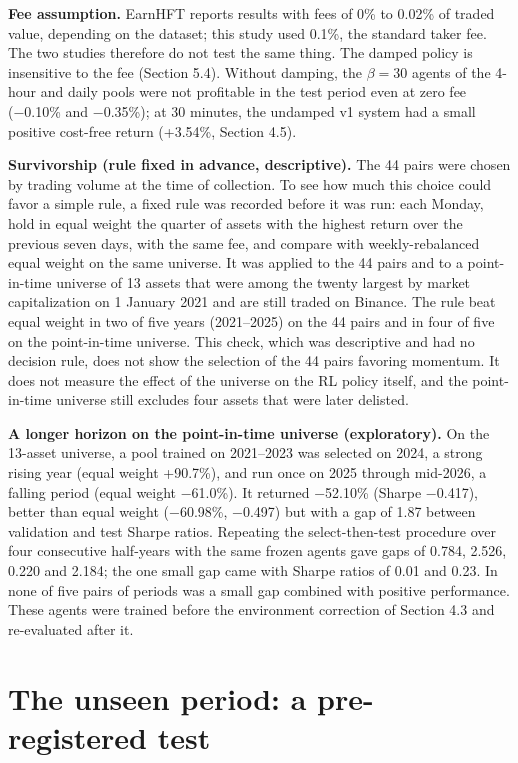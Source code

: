 \documentclass[12pt,a4paper]{report}
\newcounter{none} %
\begin{document}
\textbf{Fee assumption.} EarnHFT reports results with fees of 0\% to
0.02\% of traded value, depending on the dataset; this study used 0.1\%,
the standard taker fee. The two studies therefore do not test the same
thing. The damped policy is insensitive to the fee (Section 5.4).
Without damping, the \(\beta=30\) agents of the 4-hour and daily pools
were not profitable in the test period even at zero fee (−0.10\% and
−0.35\%); at 30 minutes, the undamped v1 system had a small positive
cost-free return (+3.54\%, Section 4.5).

\textbf{Survivorship (rule fixed in advance, descriptive).} The 44 pairs
were chosen by trading volume at the time of collection. To see how much
this choice could favor a simple rule, a fixed rule was recorded before
it was run: each Monday, hold in equal weight the quarter of assets with
the highest return over the previous seven days, with the same fee, and
compare with weekly-rebalanced equal weight on the same universe. It was
applied to the 44 pairs and to a point-in-time universe of 13 assets
that were among the twenty largest by market capitalization on 1 January
2021 and are still traded on Binance. The rule beat equal weight in two
of five years (2021--2025) on the 44 pairs and in four of five on the
point-in-time universe. This check, which was descriptive and had no
decision rule, does not show the selection of the 44 pairs favoring
momentum. It does not measure the effect of the universe on the RL
policy itself, and the point-in-time universe still excludes four assets
that were later delisted.

\textbf{A longer horizon on the point-in-time universe (exploratory).}
On the 13-asset universe, a pool trained on 2021--2023 was selected on
2024, a strong rising year (equal weight +90.7\%), and run once on 2025
through mid-2026, a falling period (equal weight −61.0\%). It returned
−52.10\% (Sharpe −0.417), better than equal weight (−60.98\%, −0.497)
but with a gap of 1.87 between validation and test Sharpe ratios.
Repeating the select-then-test procedure over four consecutive
half-years with the same frozen agents gave gaps of 0.784, 2.526, 0.220
and 2.184; the one small gap came with Sharpe ratios of 0.01 and 0.23.
In none of five pairs of periods was a small gap combined with positive
performance. These agents were trained before the environment correction
of Section 4.3 and re-evaluated after it.

\section{The unseen period: a pre-registered
test}\label{the-unseen-period-a-pre-registered-test}
\end{document}
